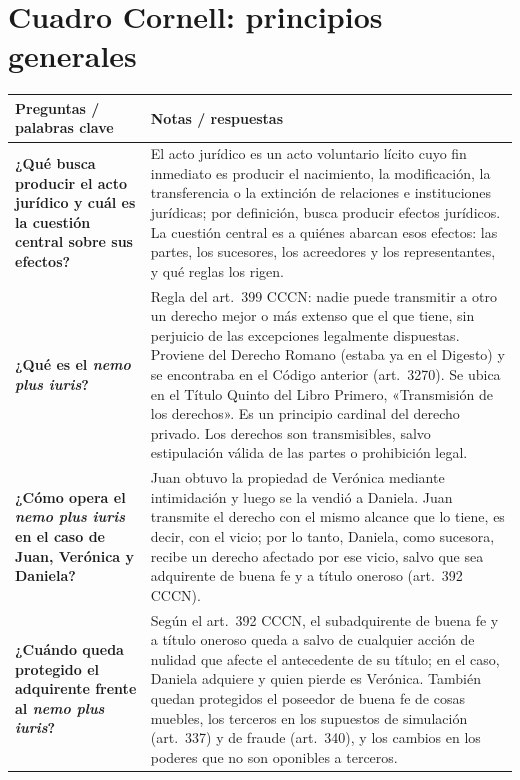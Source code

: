 \documentclass[12pt,oneside]{book}
\begin{document}
\section{Cuadro Cornell: principios generales}

\begin{table}[H]
\centering
\small
\renewcommand{\arraystretch}{1.3}
\begin{tabularx}{\textwidth}{
    >{\raggedright\arraybackslash}p{}
    >{\raggedright\arraybackslash}X
}
\toprule
\textbf{Preguntas / palabras clave} &
\textbf{Notas / respuestas} \\
\midrule

\textbf{¿Qué busca producir el acto jurídico y cuál es la cuestión central sobre sus efectos?} &
El acto jurídico es un acto voluntario lícito cuyo fin inmediato es producir el nacimiento, la modificación, la transferencia o la extinción de relaciones e instituciones jurídicas; por definición, busca producir efectos jurídicos. La cuestión central es a quiénes abarcan esos efectos: las partes, los sucesores, los acreedores y los representantes, y qué reglas los rigen. \\

\midrule

\textbf{¿Qué es el \textit{nemo plus iuris}?} &
Regla del art.~399 CCCN: nadie puede transmitir a otro un derecho mejor o más extenso que el que tiene, sin perjuicio de las excepciones legalmente dispuestas. Proviene del Derecho Romano (estaba ya en el Digesto) y se encontraba en el Código anterior (art.~3270). Se ubica en el Título Quinto del Libro Primero, «Transmisión de los derechos». Es un principio cardinal del derecho privado. Los derechos son transmisibles, salvo estipulación válida de las partes o prohibición legal. \\

\midrule

\textbf{¿Cómo opera el \textit{nemo plus iuris} en el caso de Juan, Verónica y Daniela?} &
Juan obtuvo la propiedad de Verónica mediante intimidación y luego se la vendió a Daniela. Juan transmite el derecho con el mismo alcance que lo tiene, es decir, con el vicio; por lo tanto, Daniela, como sucesora, recibe un derecho afectado por ese vicio, salvo que sea adquirente de buena fe y a título oneroso (art.~392 CCCN). \\

\midrule

\textbf{¿Cuándo queda protegido el adquirente frente al \textit{nemo plus iuris}?} &
Según el art.~392 CCCN, el subadquirente de buena fe y a título oneroso queda a salvo de cualquier acción de nulidad que afecte el antecedente de su título; en el caso, Daniela adquiere y quien pierde es Verónica. También quedan protegidos el poseedor de buena fe de cosas muebles, los terceros en los supuestos de simulación (art.~337) y de fraude (art.~340), y los cambios en los poderes que no son oponibles a terceros. \\


\end{tabularx}
\end{table}
\end{document}
